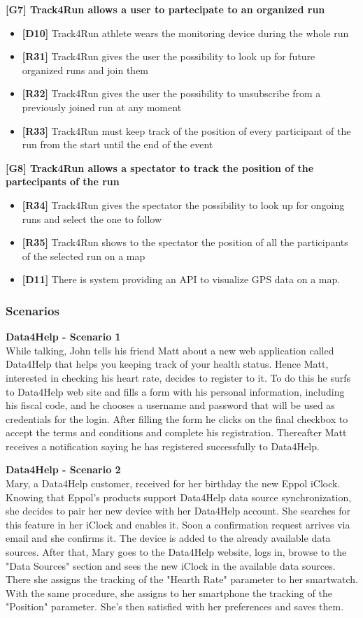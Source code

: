 \textbf{[G7] Track4Run allows a user to partecipate to an organized run}
\begin{itemize}
	\item \textbf{[D10]} Track4Run athlete wears the monitoring device during the whole run
	\item \textbf{[R31]} Track4Run gives the user the possibility to look up for future organized runs and join them
	\item \textbf{[R32]} Track4Run gives the user the possibility to unsubscribe from a previously joined run at any moment
	\item \textbf{[R33]} Track4Run must keep track of the position of every participant of the run from the start until the end of the event
\end{itemize}

\textbf{[G8] Track4Run allows a spectator to track the position of the partecipants of the run}
\begin{itemize}
	\item \textbf{[R34]} Track4Run gives the spectator the possibility to look up for ongoing runs and select the one to follow
	\item \textbf{[R35]} Track4Run shows to the spectator the position of all the participants of the selected run on a map
	\item \textbf{[D11]} There is system providing an API to visualize GPS data on a map.
\end{itemize}
 
\subsubsection{Scenarios}
\textbf{Data4Help - Scenario 1} \\
While talking, John tells his friend Matt about a new web application called Data4Help that helps you keeping track of your health status. Hence Matt, interested in checking his heart rate, decides to register to it. To do this he surfs to Data4Help web site and fills a form with his personal information, including his fiscal code, and he chooses a username and password  that will be used as credentials for the login.
After filling the form he clicks on the final checkbox to accept the terms and conditions and complete his registration.
Thereafter Matt receives a notification saying he has registered successfully to Data4Help.

\textbf{Data4Help - Scenario 2} \\
Mary, a Data4Help customer, received for her birthday the new Eppol iClock. Knowing that Eppol's products support Data4Help data source synchronization, she decides to pair her new device with her Data4Help account. She searches for this feature in her iClock and enables it.
Soon a confirmation request arrives via email and she confirms it. The device is added to the already available data sources.
After that, Mary goes to the Data4Help website, logs in, browse to the "Data Sources" section and sees the new iClock in the available data sources. There she assigns the tracking of the "Hearth Rate" parameter to her smartwatch. With the same procedure, she assigns to her smartphone the tracking of the "Position" parameter.
She's then satisfied with her preferences and saves them.

